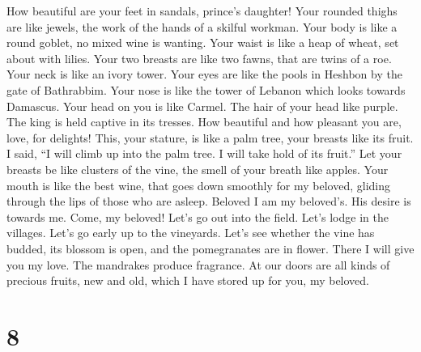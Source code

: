  How beautiful are your feet in sandals, prince's
daughter! Your rounded thighs are like jewels, the work of the hands of
a skilful workman.  Your body is like a round goblet, no
mixed wine is wanting. Your waist is like a heap of wheat, set about
with lilies.  Your two breasts are like two fawns, that
are twins of a roe.  Your neck is like an ivory tower.
Your eyes are like the pools in Heshbon by the gate of Bathrabbim. Your
nose is like the tower of Lebanon which looks towards Damascus.
 Your head on you is like Carmel. The hair of your head
like purple. The king is held captive in its tresses.  How
beautiful and how pleasant you are, love, for delights! 
This, your stature, is like a palm tree, your breasts like its fruit.
 I said, ``I will climb up into the palm tree. I will take
hold of its fruit.'' Let your breasts be like clusters of the vine, the
smell of your breath like apples.  Your mouth is like the
best wine, that goes down smoothly for my beloved, gliding through the
lips of those who are asleep. Beloved  I am my beloved's.
His desire is towards me.  Come, my beloved! Let's go out
into the field. Let's lodge in the villages.  Let's go
early up to the vineyards. Let's see whether the vine has budded, its
blossom is open, and the pomegranates are in flower. There I will give
you my love.  The mandrakes produce fragrance. At our
doors are all kinds of precious fruits, new and old, which I have stored
up for you, my beloved.

\hypertarget{section-7}{%
\section{8}\label{section-7}}

